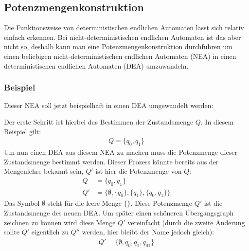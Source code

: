 \subsection{Potenzmengenkonstruktion}
\begin{flushleft}
    Die Funktionsweise von deterministischen endlichen Automaten lässt sich relativ einfach erkennen.
    Bei nicht-deterministischen endlichen Automaten ist das aber nicht so, deshalb kann man eine Potenzmengenkonstruktion 
    durchführen um einen beliebigen nicht-deterministischen endlichen Automaten (NEA) in einen deterministischen endlichen 
    Automaten (DEA) umzuwandeln.
    \subsubsection{Beispiel}
    Dieser NEA soll jetzt beispielhaft in einen DEA umgewandelt werden:
    \begin{center}
    \end{center}
    Der erste Schritt ist hierbei das Bestimmen der Zustandsmenge $Q$. In diesem Beispiel gilt:
    \begin{align}
        Q=\{q_0,q_1\}
    \end{align}
    Um nun einen DEA aus diesem NEA zu machen muss die Potenzmenge dieser Zustandsmenge bestimmt werden.
    Dieser Prozess könnte bereits aus der Mengenlehre bekannt sein, $Q'$ ist hier die Potenzmenge von $Q$:
    \begin{align}
        Q &=\{q_0,q_1\} \\
        Q' &=\{\emptyset,\{q_0\},\{q_1\},\{q_0,q_1\}\}
    \end{align}
    Das Symbol $\emptyset$ steht für die leere Menge $\{\}$. Diese Potenzmenge $Q'$ ist die Zustandsmenge 
    des neuen DEA. Um später einen schöneren Übergangsgraph zeichnen zu können wird diese Menge $Q'$ vereinfacht 
    (durch die zweite Änderung sollte $Q'$ eigentlich zu $Q''$ werden, hier bleibt der Name jedoch gleich):
    \begin{align}
        Q' =\{\emptyset,q_0,q_1,q_{01}\}
    \end{align}

\end{flushleft}
